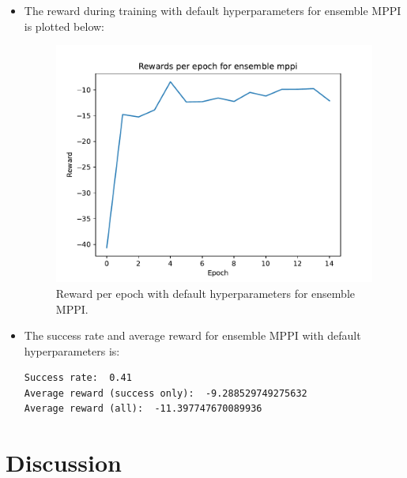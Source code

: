 \documentclass[12pt]{article}
\newcommand{\0}{\boldsymbol{0}}
\newcommand{\1}{\boldsymbol{1}}
\begin{document}
\begin{itemize}
    \item The reward during training with default hyperparameters for ensemble MPPI is plotted below:

    \begin{figure}[H]
        \centering
        \includegraphics[width=.7\linewidth]{../figs/ensemble_mppi.pdf}
        \caption{Reward per epoch with default hyperparameters for ensemble MPPI.}
        \label{fig:fig1}
    \end{figure}

    \item The success rate and average reward for ensemble MPPI with default hyperparameters is:
    \begin{verbatim}
Success rate:  0.41
Average reward (success only):  -9.288529749275632
Average reward (all):  -11.397747670089936
    \end{verbatim}
\end{itemize}

\newpage

\section{Discussion}
\end{document}
